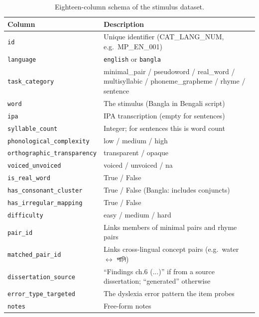 \begin{table}[H]
\centering
\small
\renewcommand{\arraystretch}{1.5}
\begin{tabularx}{\textwidth}{|l|X|}
\hline
\textbf{Column} & \textbf{Description} \\
\hline
\texttt{id}                       & Unique identifier (CAT\_LANG\_NUM, e.g.\ MP\_EN\_001) \\
\hline
\texttt{language}                 & \texttt{english} or \texttt{bangla} \\
\hline
\texttt{task\_category}           & minimal\_pair / pseudoword / real\_word / multisyllabic / phoneme\_grapheme / rhyme / sentence \\
\hline
\texttt{word}                     & The stimulus (Bangla in Bengali script) \\
\hline
\texttt{ipa}                      & IPA transcription (empty for sentences) \\
\hline
\texttt{syllable\_count}          & Integer; for sentences this is word count \\
\hline
\texttt{phonological\_complexity} & low / medium / high \\
\hline
\texttt{orthographic\_transparency} & transparent / opaque \\
\hline
\texttt{voiced\_unvoiced}         & voiced / unvoiced / na \\
\hline
\texttt{is\_real\_word}           & True / False \\
\hline
\texttt{has\_consonant\_cluster}  & True / False (Bangla: includes conjuncts) \\
\hline
\texttt{has\_irregular\_mapping}  & True / False \\
\hline
\texttt{difficulty}               & easy / medium / hard \\
\hline
\texttt{pair\_id}                 & Links members of minimal pairs and rhyme pairs \\
\hline
\texttt{matched\_pair\_id}        & Links cross-lingual concept pairs (e.g.\ water $\leftrightarrow$ {\banglafont পানি}) \\
\hline
\texttt{dissertation\_source}     & ``Findings ch.6 (...)'' if from a source dissertation; ``generated'' otherwise \\
\hline
\texttt{error\_type\_targeted}    & The dyslexia error pattern the item probes \\
\hline
\texttt{notes}                    & Free-form notes \\
\hline
\end{tabularx}
\caption{Eighteen-column schema of the stimulus dataset.}
\end{table}

